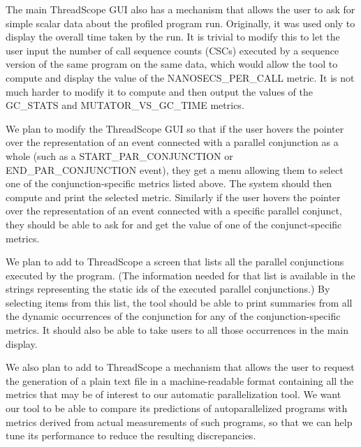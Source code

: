 The main ThreadScope GUI also has a mechanism that allows the user
to ask for simple scalar data about the profiled program run.
Originally, it was used only to display the overall time taken by the run.
It is trivial to modify this to let the user input
the number of call sequence counts (CSCs)
executed by a sequence version of the same program on the same data,
which would allow the tool to compute and display
the value of the NANOSECS\_PER\_CALL metric.
It is not much harder to modify it to compute and then output
the values of the GC\_STATS and MUTATOR\_VS\_GC\_TIME metrics.

We plan to modify the ThreadScope GUI so that
if the user hovers the pointer over the representation
of an event connected with a parallel conjunction as a whole
(such as a START\_PAR\_CONJUNCTION or END\_PAR\_CONJUNCTION event),
they get a menu allowing them to select
one of the conjunction-specific metrics listed above.
The system should then compute and print the selected metric.
Similarly if the user hovers the pointer over the representation
of an event connected with a specific parallel conjunct,
they should be able to ask for and get
the value of one of the conjunct-specific metrics.

We plan to add to ThreadScope a screen
that lists all the parallel conjunctions executed by the program.
(The information needed for that list is available in the strings
representing the static ids of the executed parallel conjunctions.)
By selecting items from this list,
the tool should be able to print summaries
from all the dynamic occurrences of the conjunction
for any of the conjunction-specific metrics.
It should also be able to take users
to all those occurrences in the main display.

We also plan to add to ThreadScope
a mechanism that allows the user to request
the generation of a plain text file in a machine-readable format
containing all the metrics that may be of interest
to our automatic parallelization tool.
We want our tool to be able to compare
its predictions of autoparallelized programs
with metrics derived from actual measurements of such programs,
so that we can help tune its performance to reduce the resulting discrepancies.

